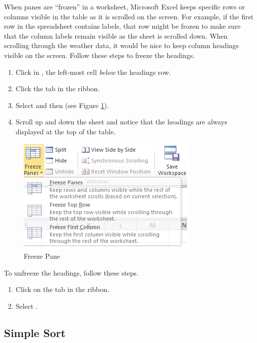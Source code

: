 When panes are ``frozen'' in a worksheet, Microsoft Excel keeps specific rows or columns visible in the table as it is scrolled on the screen. For example, if the first row in the spreadsheet contains labels, that row might be frozen to make sure that the column labels remain visible as the sheet is scrolled down. When scrolling through the weather data, it would be nice to keep column headings visible on the screen. Follow these steps to freeze the headings.

\begin{enumerate}
	\item Click in , the left-most cell \textit{below} the headings row.
	\item Click the  tab in the ribbon.
	\item Select  and then  (see Figure \ref{05:fig07}).
	\item Scroll up and down the sheet and notice that the headings are always displayed at the top of the table.
\end{enumerate}

\begin{figure}[H]
	\centering
	\includegraphics[width=\maxwidth{.95\linewidth}]{gfx/ch05_fig07}
	\caption{Freeze Pane}
	\label{05:fig07}
\end{figure}

To unfreeze the headings, follow these steps.

\begin{enumerate}
	\item Click on the  tab in the ribbon.
	\item Select .
\end{enumerate}

\subsection{Simple Sort}

